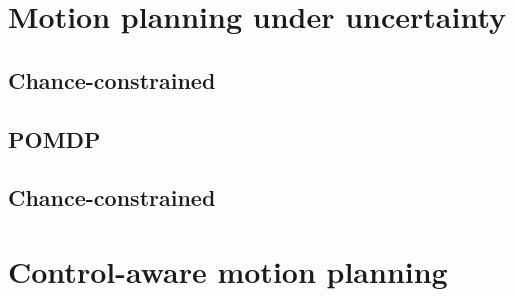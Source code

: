 


\section{Motion planning under uncertainty}

\subsection{Chance-constrained}

\subsection{POMDP}

\subsection{Chance-constrained}

\section{Control-aware motion planning}


